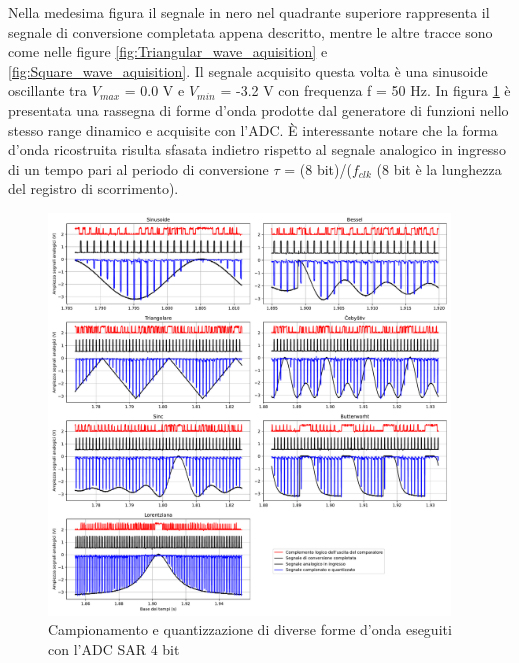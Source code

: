 \documentclass[journal]{IEEEtran}
\begin{document}
Nella medesima figura il segnale in nero nel quadrante superiore rappresenta il segnale di conversione completata appena descritto, mentre le altre tracce sono come nelle figure \ref{fig:Triangular_wave_aquisition} e \ref{fig:Square_wave_aquisition}. Il segnale acquisito questa volta è una sinusoide oscillante tra $V_{max}$ = 0.0 V e $V_{min}$ = -3.2 V con frequenza f = 50 Hz. In figura \ref{fig:waveforms_no_sh_scope} è presentata una rassegna di forme d'onda prodotte dal generatore di funzioni nello stesso range dinamico e acquisite con l'ADC. È interessante notare che la forma d'onda ricostruita risulta sfasata indietro rispetto al segnale analogico in ingresso di un tempo pari al periodo di conversione $\tau$ = (8 bit)/($f_{clk}$ (8 bit è la lunghezza del registro di scorrimento).



\begin{figure}[t]%
\centering
\includegraphics[trim = {30 0 50 0}, width=0.95\textwidth]{analysis/output/waveforms.pdf}
\caption{Campionamento e quantizzazione di diverse forme d'onda eseguiti con l'ADC SAR 4 bit}
\label{fig:waveforms_no_sh_scope}
\end{figure}
\end{document}
